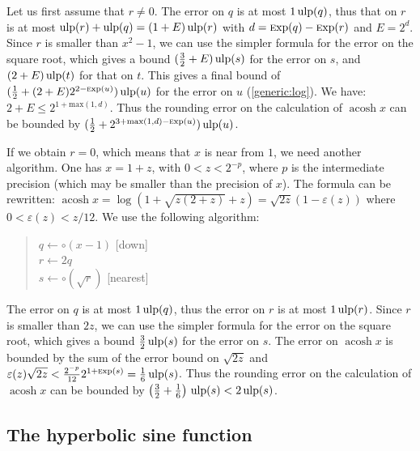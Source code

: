 \documentclass[12pt]{amsart}
\DeclareMathOperator{\acosh}{acosh}
\def\ulp{{\rm ulp}}
\def\Exp{{\rm \textsc exp}}
\begin{document}
Let us first assume that $r \ne 0$. The error on $q$ is at most $1\,\ulp(q)$,
thus that on $r$ is at most $\ulp(r) + \ulp(q) = (1+E)\,\ulp(r)$ with
$d = \Exp(q) - \Exp(r)$ and $E = 2^d$.
Since $r$ is smaller than $x^2-1$, we can use the simpler formula for the
error on the square root, which gives a bound $(\frac{3}{2} + E)\,\ulp(s)$
for the error on $s$, and $(2 + E)\,\ulp(t)$ for that on $t$. This gives
a final bound of $(\frac{1}{2} + (2 + E) 2^{2-\Exp(u)})\,\ulp(u)$ for the
error on $u$ (\textsection\ref{generic:log}).
We have: $2 + E \leq 2^{1 + \mathrm{max}(1,d)}$. Thus the rounding error
on the calculation of $\acosh x$ can be bounded by
$(\frac{1}{2} + 2^{3 + \mathrm{max}(1,d) - \Exp(u)})\,\ulp(u)$.

If we obtain $r = 0$, which means that $x$ is near from $1$,
we need another algorithm.
One has $x = 1 + z$, with $0 < z < 2^{-p}$, where $p$ is the intermediate
precision (which may be smaller than the precision of $x$). The formula
can be rewritten:
$\acosh x = \log (1 + \sqrt{z(2+z)} + z) = \sqrt{2z} (1 - \varepsilon(z))$
where $0 < \varepsilon(z) < z / 12$.
We use the following algorithm:
\begin{quote}
$q \leftarrow \circ(x - 1)$ [down] \\
$r \leftarrow 2q$ \\
$s \leftarrow \circ(\sqrt{r})$ [nearest]
\end{quote}

The error on $q$ is at most $1\,\ulp(q)$, thus the error on $r$ is at most
$1\,\ulp(r)$. Since $r$ is smaller than $2z$, we can use the simpler formula
for the error on the square root, which gives a bound $\frac{3}{2}\,\ulp(s)$
for the error on $s$. The error on $\acosh x$ is bounded by the sum of the
error bound on $\sqrt{2z}$ and $\varepsilon(z) \sqrt{2z} <
\frac{2^{-p}}{12} 2^{1+\Exp(s)} = \frac{1}{6}\,\ulp(s)$.
Thus the rounding error on the calculation of $\acosh x$ can be bounded by
$\left(\frac{3}{2} + \frac{1}{6}\right)\,\ulp(s) < 2\,\ulp(s)$.

\subsection{The hyperbolic sine function}
\end{document}
